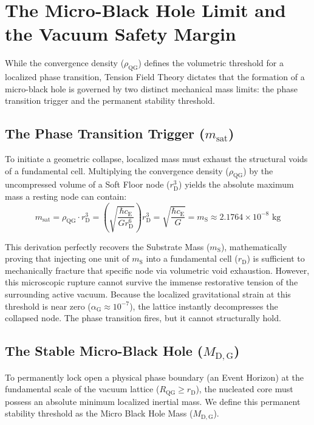 \section{The Micro-Black Hole Limit and the Vacuum Safety Margin}
While the convergence density ($\rho_{\mathrm{QG}}$) defines the volumetric threshold for a localized phase transition, Tension Field Theory dictates that the formation of a micro-black hole is governed by two distinct mechanical mass limits: the phase transition trigger and the permanent stability threshold.

\subsection{The Phase Transition Trigger ($m_{\mathrm{sat}}$)}
To initiate a geometric collapse, localized mass must exhaust the structural voids of a fundamental cell. Multiplying the convergence density ($\rho_{\mathrm{QG}}$) by the uncompressed volume of a Soft Floor node ($r_{\mathrm{D}}^3$) yields the absolute maximum mass a resting node can contain:
\begin{equation}
    m_{\mathrm{sat}} = \rho_{\mathrm{QG}} \cdot r_{\mathrm{D}}^3 = \left( \sqrt{\frac{\hbar c_{\mathrm{E}}}{G r_{\mathrm{D}}^6}} \right) r_{\mathrm{D}}^3 = \sqrt{\frac{\hbar c_{\mathrm{E}}}{G}} = m_{\mathrm{S}} \approx 2.1764 \times 10^{-8} \text{ kg}
\end{equation}

This derivation perfectly recovers the Substrate Mass ($m_{\mathrm{S}}$), mathematically proving that injecting one unit of $m_{\mathrm{S}}$ into a fundamental cell ($r_{\mathrm{D}}$) is sufficient to mechanically fracture that specific node via volumetric void exhaustion. However, this microscopic rupture cannot survive the immense restorative tension of the surrounding active vacuum. Because the localized gravitational strain at this threshold is near zero ($\alpha_{\mathrm{G}} \approx 10^{-7}$), the lattice instantly decompresses the collapsed node. The phase transition fires, but it cannot structurally hold.

\subsection{The Stable Micro-Black Hole ($M_{\mathrm{D,G}}$)}
To permanently lock open a physical phase boundary (an Event Horizon) at the fundamental scale of the vacuum lattice ($R_{\mathrm{QG}} \ge r_{\mathrm{D}}$), the nucleated core must possess an absolute minimum localized inertial mass. We define this permanent stability threshold as the Micro Black Hole Mass ($M_{\mathrm{D,G}}$).

